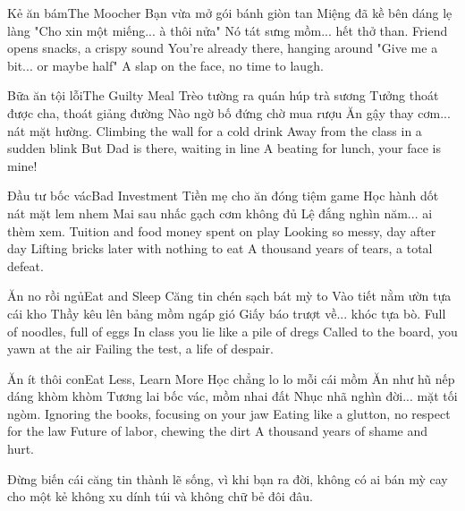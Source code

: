 \begin{tutuyetbox}{Kẻ ăn bám}{The Moocher}
Bạn vừa mở gói bánh giòn tan
Miệng đã kề bên dáng lẹ làng
"Cho xin một miếng... à thôi nửa"
Nó tát sưng mồm... hết thở than.
\tcblower
Friend opens snacks, a crispy sound 
You're already there, hanging around 
"Give me a bit... or maybe half" 
A slap on the face, no time to laugh.
\end{tutuyetbox}

\begin{tutuyetbox}{Bữa ăn tội lỗi}{The Guilty Meal}
Trèo tường ra quán húp trà sương
Tưởng thoát được cha, thoát giảng đường
Nào ngờ bố đứng chờ mua rượu
Ăn gậy thay cơm... nát mặt hường.
\tcblower
Climbing the wall for a cold drink 
Away from the class in a sudden blink 
But Dad is there, waiting in line 
A beating for lunch, your face is mine!
\end{tutuyetbox}

\begin{tutuyetbox}{Đầu tư bốc vác}{Bad Investment}
Tiền mẹ cho ăn đóng tiệm game
Học hành dốt nát mặt lem nhem
Mai sau nhấc gạch cơm không đủ
Lệ đắng nghìn năm... ai thèm xem.
\tcblower
Tuition and food money spent on play 
Looking so messy, day after day 
Lifting bricks later with nothing to eat 
A thousand years of tears, a total defeat.
\end{tutuyetbox}

\begin{tutuyetbox}{Ăn no rồi ngủ}{Eat and Sleep}
Căng tin chén sạch bát mỳ to
Vào tiết nằm ườn tựa cái kho
Thầy kêu lên bảng mồm ngáp gió
Giấy báo trượt về... khóc tựa bò.
\tcblower
Full of noodles, full of eggs 
In class you lie like a pile of dregs 
Called to the board, you yawn at the air 
Failing the test, a life of despair.
\end{tutuyetbox}

\begin{tutuyetbox}{Ăn ít thôi con}{Eat Less, Learn More}
Học chẳng lo lo mỗi cái mồm
Ăn như hũ nếp dáng khòm khòm
Tương lai bốc vác, mồm nhai đất
Nhục nhã nghìn đời... mặt tối ngòm.
\tcblower
Ignoring the books, focusing on your jaw 
Eating like a glutton, no respect for the law 
Future of labor, chewing the dirt 
A thousand years of shame and hurt.
\end{tutuyetbox}

\begin{ghichu}
Đừng biến cái căng tin thành lẽ sống, vì khi bạn ra đời, không có ai bán mỳ cay cho một kẻ không xu dính túi và không chữ bẻ đôi đâu.
\end{ghichu}